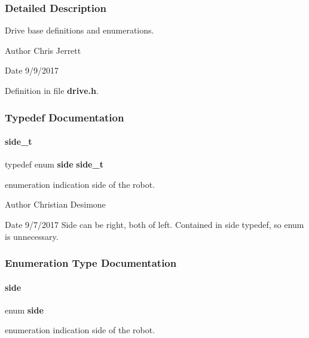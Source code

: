 \subsubsection{Detailed Description}
Drive base definitions and enumerations. 

\begin{DoxyAuthor}{Author}
Chris Jerrett 
\end{DoxyAuthor}
\begin{DoxyDate}{Date}
9/9/2017 
\end{DoxyDate}


Definition in file \textbf{ drive.\+h}.



\subsubsection{Typedef Documentation}
\mbox{\label{drive_8h_a9df2afd2f1acb97019655e5e730609c7}} 
\paragraph{side\+\_\+t}
{\footnotesize\ttfamily typedef enum \textbf{ side}  \textbf{ side\+\_\+t}}



enumeration indication side of the robot. 

\begin{DoxyAuthor}{Author}
Christian Desimone 
\end{DoxyAuthor}
\begin{DoxyDate}{Date}
9/7/2017 Side can be right, both of left. Contained in side typedef, so enum is unnecessary. 
\end{DoxyDate}


\subsubsection{Enumeration Type Documentation}
\mbox{\label{drive_8h_afc015eff6557e84151d2e53b94375445}} 
\paragraph{side}
{\footnotesize\ttfamily enum \textbf{ side}}



enumeration indication side of the robot. 

